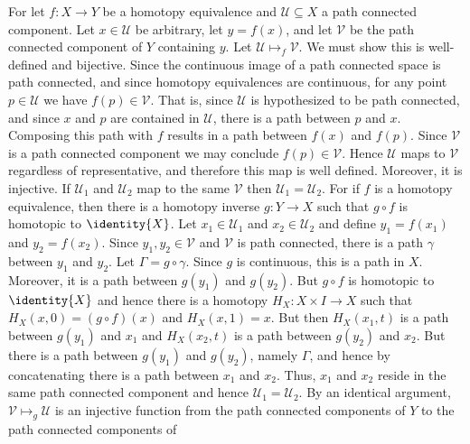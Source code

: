     \begin{solution}
        For let $f:X\rightarrow{Y}$ be a homotopy equivalence and
        $\mathcal{U}\subseteq{X}$ a path connected component. Let
        $x\in\mathcal{U}$ be arbitrary, let $y=f(x)$, and let $\mathcal{V}$ be
        the path connected component of $Y$ containing $y$. Let
        $\mathcal{U}\mapsto_{f}\mathcal{V}$. We must show this is well-defined
        and bijective. Since the continuous image of a path connected space is
        path connected, and since homotopy equivalences are continuous, for any
        point $p\in\mathcal{U}$ we have $f(p)\in\mathcal{V}$. That is, since
        $\mathcal{U}$ is hypothesized to be path connected, and since $x$ and
        $p$ are contained in $\mathcal{U}$, there is a path between $p$ and $x$.
        Composing this path with $f$ results in a path between $f(x)$ and
        $f(p)$. Since $\mathcal{V}$ is a path connected component we may
        conclude $f(p)\in\mathcal{V}$. Hence $\mathcal{U}$ maps to $\mathcal{V}$
        regardless of representative, and therefore this map is well defined.
        Moreover, it is injective. If
        $\mathcal{U}_{1}$ and $\mathcal{U}_{2}$ map to the same $\mathcal{V}$
        then $\mathcal{U}_{1}=\mathcal{U}_{2}$. For if $f$ is a homotopy
        equivalence, then there is a homotopy inverse $g:Y\rightarrow{X}$ such
        that $g\circ{f}$ is homotopic to $\identity{X}$. Let
        $x_{1}\in\mathcal{U}_{1}$ and $x_{2}\in\mathcal{U}_{2}$ and define
        $y_{1}=f(x_{1})$ and $y_{2}=f(x_{2})$. Since $y_{1},y_{2}\in\mathcal{V}$
        and $\mathcal{V}$ is path connected, there is a path $\gamma$ between
        $y_{1}$ and $y_{2}$. Let $\Gamma=g\circ\gamma$. Since $g$ is continuous,
        this is a path in $X$. Moreover, it is a path between $g(y_{1})$ and
        $g(y_{2})$. But $g\circ{f}$ is homotopic to $\identity{X}$
        and hence there is a homotopy $H_{X}:X\times{I}\rightarrow{X}$ such that
        $H_{X}(x,0)=(g\circ{f})(x)$ and $H_{X}(x,1)=x$. But then
        $H_{X}(x_{1},t)$ is a path between $g(y_{1})$ and $x_{1}$ and
        $H_{X}(x_{2},t)$ is a path between $g(y_{2})$ and $x_{2}$. But there is
        a path between $g(y_{1})$ and $g(y_{2})$, namely $\Gamma$, and hence by
        concatenating there is a path between $x_{1}$ and $x_{2}$. Thus,
        $x_{1}$ and $x_{2}$ reside in the same path connected component and
        hence $\mathcal{U}_{1}=\mathcal{U}_{2}$. By an identical argument,
        $\mathcal{V}\mapsto_{g}\mathcal{U}$ is an injective function from the
        path connected components of $Y$ to the path connected components of

\end{solution}
